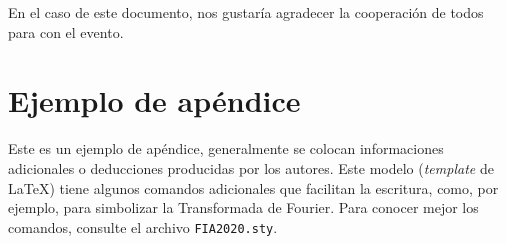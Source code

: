 \documentclass[12pt, a4paper, twoside, twocolumn]{article}
\begin{document}
En el caso de este documento, nos gustaría agradecer la cooperación de todos para con el evento.
\renewcommand{\refname}{Referências} 
%  
{{\fontrefs }
\appendix
\section{Ejemplo de apéndice}

Este es un ejemplo de apéndice, generalmente se colocan informaciones adicionales o deducciones producidas por los autores.
Este modelo (\textit{template} de \LaTeX) tiene algunos comandos adicionales que facilitan la escritura, como, por ejemplo,  \F\xspace para simbolizar la Transformada de Fourier. Para conocer mejor los comandos, consulte el archivo  \texttt{FIA2020.sty}.

}
%
%

\end{document}
